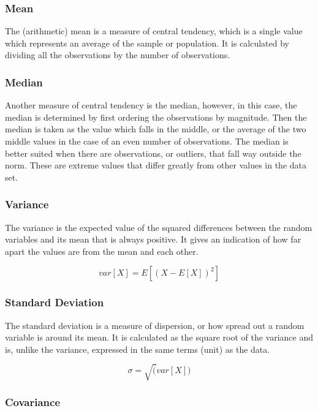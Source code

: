 \documentclass[11pt,a4paper]{article}
\begin{document}
\subsubsection{Mean}\label{mean}

The (arithmetic) mean is a measure of central tendency, which is a
single value which represents an average of the sample or population. It
is calculated by dividing all the observations by the number of
observations.

\subsubsection{Median}\label{median}

Another measure of central tendency is the median, however, in this
case, the median is determined by first ordering the observations by
magnitude. Then the median is taken as the value which falls in the
middle, or the average of the two middle values in the case of an even
number of observations. The median is better suited when there are
observations, or outliers, that fall way outside the norm. These are
extreme values that differ greatly from other values in the data set.

\subsubsection{Variance}\label{variance}

The variance is the expected value of the squared differences between
the random variables and its mean that is always positive. It gives an
indication of how far apart the values are from the mean and each other.

\[ var[X] = E[(X - E[X])^2] \]

\subsubsection{Standard Deviation}\label{standard-deviation}

The standard deviation is a measure of dispersion, or how spread out a
random variable is around its mean. It is calculated as the square root
of the variance and is, unlike the variance, expressed in the same terms
(unit) as the data.

\[ \sigma = \sqrt(var[X]) \]

\subsubsection{Covariance}\label{covariance}
\end{document}
